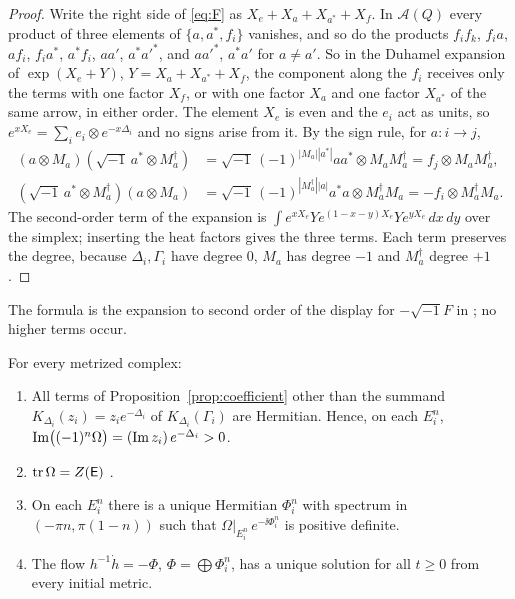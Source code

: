 \begin{proof}
Write the right side of \eqref{eq:F} as $X_e+X_a+X_{a^*}+X_f$. In
$\mathcal A(Q)$ every product of three elements of $\{a,a^*,f_i\}$ vanishes,
and so do the products $f_if_k$, $f_ia$, $af_i$, $f_ia^*$, $a^*f_i$, $aa'$,
$a^*a'^*$, and $aa'^*$, $a^*a'$ for $a\neq a'$. So in the Duhamel expansion of
$\exp(X_e+Y)$, $Y=X_a+X_{a^*}+X_f$, the component along the $f_i$ receives
only the terms with one factor $X_f$, or with one factor $X_a$ and one
factor $X_{a^*}$ of the same arrow, in either order. The element $X_e$ is
even and the $e_i$ act as units, so
$e^{xX_e}=\sum_ie_i\otimes e^{-x\Delta_i}$ and no signs arise from it. By the
sign rule, for $a:i\to j$,
\begin{align*}
 (a\otimes M_a)(\sqrt{-1}\,a^*\otimes M_a^\dagger)
 &=\sqrt{-1}\,(-1)^{|M_a||a^*|}aa^*\otimes M_aM_a^\dagger=f_j\otimes M_aM_a^\dagger,\\
 (\sqrt{-1}\,a^*\otimes M_a^\dagger)(a\otimes M_a)
 &=\sqrt{-1}\,(-1)^{|M_a^\dagger||a|}a^*a\otimes M_a^\dagger M_a=-f_i\otimes M_a^\dagger M_a .
\end{align*}
The second-order term of the expansion is
$\int e^{xX_e}Ye^{(1-x-y)X_e}Ye^{yX_e}\,dx\,dy$ over the simplex; inserting the
heat factors gives the three terms. Each term preserves the degree, because
$\Delta_i,\Gamma_i$ have degree $0$, $M_a$ has degree $-1$ and $M_a^\dagger$
degree $+1$.
\end{proof}

The formula is the expansion to second order of the display for
$-\sqrt{-1}F$ in \cite[\S5.4]{hkkp26}; no higher terms occur.

\begin{proposition}\label{prop:properties}
For every metrized complex:
\begin{enumerate}
\item[(a)] All terms of Proposition~\ref{prop:coefficient} other than the
 summand $K_{\Delta_i}(z_i)=z_ie^{-\Delta_i}$ of $K_{\Delta_i}(\Gamma_i)$ are
 Hermitian. Hence, on each $E_i^n$,
 $\operatorname{Im}\bigl((-1)^n\Omega\bigr)=(\operatorname{Im} z_i)\,e^{-\Delta_i}>0$.
\item[(b)] $\operatorname{tr}\Omega=Z(\mathsf E)$ \cite[Lemma~5.17]{hkkp26}.
\item[(c)] On each $E_i^n$ there is a unique Hermitian $\Phi_i^n$ with
 spectrum in $(-\pi n,\pi(1-n))$ such that
 $\Omega|_{E_i^n}\,e^{-\ii\Phi_i^n}$ is positive definite.
\item[(d)] The flow $h^{-1}\dot h=-\Phi$, $\Phi=\bigoplus\Phi_i^n$, has a
 unique solution for all $t\geq0$ from every initial metric.
\end{enumerate}
\end{proposition}

